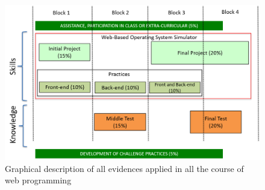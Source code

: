 \begin{figure}[bt]
  \centering
    \includegraphics[scale=0.6]{images/evidence.png}
    \caption{Graphical description of all evidences applied in all the course of web programming }
    \label{fig:evidences}
\end{figure}
